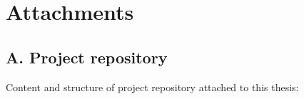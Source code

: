 \documentclass[12pt,a4paper]{report}
\begin{document}



\setcounter{tocdepth}{1}
\tableofcontents














\listoffigures

\lstlistoflistings
{}



\appendix
\chapter*{Attachments}

\section*{A. Project repository}
Content and structure of project repository attached to this thesis:
\end{document}
